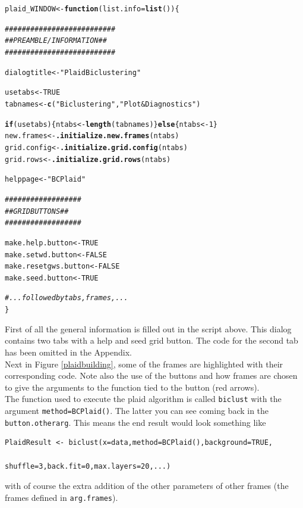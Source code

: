 \documentclass[a4paper]{article}\usepackage[]{graphicx}\usepackage[]{color}
\makeatletter
\newcommand{\hlnum}[1]{\textcolor[rgb]{0.686,0.059,0.569}{#1}}%
\newcommand{\hlstr}[1]{\textcolor[rgb]{0.192,0.494,0.8}{#1}}%
\newcommand{\hlcom}[1]{\textcolor[rgb]{0.678,0.584,0.686}{\textit{#1}}}%
\newcommand{\hlstd}[1]{\textcolor[rgb]{0.345,0.345,0.345}{#1}}%
\newcommand{\hlkwa}[1]{\textcolor[rgb]{0.161,0.373,0.58}{\textbf{#1}}}%
\newcommand{\hlkwb}[1]{\textcolor[rgb]{0.69,0.353,0.396}{#1}}%
\newcommand{\hlkwc}[1]{\textcolor[rgb]{0.333,0.667,0.333}{#1}}%
\newcommand{\hlkwd}[1]{\textcolor[rgb]{0.737,0.353,0.396}{\textbf{#1}}}%
\newenvironment{kframe}{%
 \def\at@end@of@kframe{}%
 \ifinner\ifhmode%
  \def\at@end@of@kframe{\end{minipage}}%
  \begin{minipage}{\columnwidth}%
 \fi\fi%
 \def\FrameCommand##1{\hskip\@totalleftmargin \hskip-\fboxsep
 \colorbox{shadecolor}{##1}\hskip-\fboxsep
     \hskip-\linewidth \hskip-\@totalleftmargin \hskip\columnwidth}%
 \MakeFramed {\advance\hsize-\width
   \@totalleftmargin\z@ \linewidth\hsize
   \@setminipage}}%
 {\par\unskip\endMakeFramed%
 \at@end@of@kframe}
\newenvironment{knitrout}{}{} %
\makeatother
\begin{document}
\begin{knitrout}
\color{fgcolor}\begin{kframe}
\begin{alltt}
\hlstd{plaid_WINDOW} \hlkwb{<-} \hlkwa{function}\hlstd{(}\hlkwc{list.info}\hlstd{=}\hlkwd{list}\hlstd{())\{}

    \hlcom{##########################}
    \hlcom{## PREAMBLE/INFORMATION ##}
    \hlcom{##########################}

    \hlstd{dialogtitle} \hlkwb{<-} \hlstr{"Plaid Biclustering"}

    \hlstd{usetabs} \hlkwb{<-} \hlnum{TRUE}
    \hlstd{tabnames} \hlkwb{<-} \hlkwd{c}\hlstd{(}\hlstr{"Biclustering"}\hlstd{,}\hlstr{"Plot & Diagnostics"}\hlstd{)}

    \hlkwa{if}\hlstd{(usetabs)\{ntabs} \hlkwb{<-} \hlkwd{length}\hlstd{(tabnames)\}} \hlkwa{else} \hlstd{\{ntabs} \hlkwb{<-} \hlnum{1}\hlstd{\}}
    \hlstd{new.frames} \hlkwb{<-} \hlkwd{.initialize.new.frames}\hlstd{(ntabs)}
    \hlstd{grid.config} \hlkwb{<-} \hlkwd{.initialize.grid.config}\hlstd{(ntabs)}
    \hlstd{grid.rows} \hlkwb{<-} \hlkwd{.initialize.grid.rows}\hlstd{(ntabs)}

    \hlstd{helppage} \hlkwb{<-} \hlstr{"BCPlaid"}

    \hlcom{##################}
    \hlcom{## GRID BUTTONS ##}
    \hlcom{##################}

    \hlstd{make.help.button} \hlkwb{<-} \hlnum{TRUE}
    \hlstd{make.setwd.button} \hlkwb{<-} \hlnum{FALSE}
    \hlstd{make.resetgws.button} \hlkwb{<-} \hlnum{FALSE}
    \hlstd{make.seed.button} \hlkwb{<-} \hlnum{TRUE}

        \hlcom{#... followed by tabs, frames,...}
\hlstd{\}}
\end{alltt}
\end{kframe}
\end{knitrout}
\noindent First of all the general information is filled out in the script
above.
This dialog contains two tabs with a help and seed grid button. 
The code for the second tab has been omitted in the Appendix.\\
Next in Figure \ref{plaidbuilding}, some of the frames are highlighted with
their corresponding code. Note also the use of the buttons and how frames are
chosen to give the arguments to the function tied to the button (red arrows).\\
The function used to execute the plaid algorithm is called \verb|biclust| with
the argument \verb|method=BCPlaid()|. The latter you can see coming back in the
\verb|button.otherarg|. This means the end result would look something like
\begin{verbatim}
PlaidResult <- biclust(x=data,method=BCPlaid(),background=TRUE,
                                shuffle=3,back.fit=0,max.layers=20,...)
\end{verbatim}
with of course the extra addition of the other parameters of other frames (the
frames defined in \verb|arg.frames|).
\end{document}
